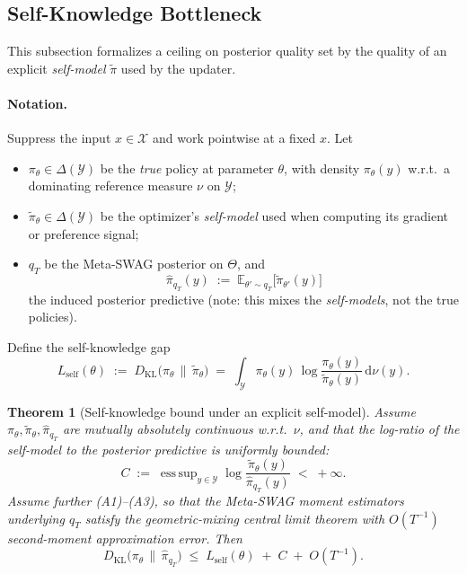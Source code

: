 \documentclass[10pt]{article}
\theoremstyle{plain}
\newtheorem{theorem}{Theorem}
\theoremstyle{definition}
\theoremstyle{remark}
\newcommand{\E}{\mathbb{E}}
\newcommand{\KL}{D_{\mathrm{KL}}}
\DeclareMathOperator*{\esssup}{ess\,sup}
\begin{document}
\subsection{Self-Knowledge Bottleneck}\label{sec:self}

This subsection formalizes a ceiling on posterior quality set by the quality of an explicit \emph{self-model} $\tilde\pi$ used by the updater.

\paragraph{Notation.} Suppress the input $x\in\mathcal{X}$ and work pointwise at a fixed $x$. Let
\begin{itemize}[leftmargin=1.5em,itemsep=0.1em]
  \item $\pi_\theta\in\Delta(\mathcal{Y})$ be the \emph{true} policy at parameter $\theta$, with density $\pi_\theta(y)$ w.r.t.\ a dominating reference measure $\nu$ on $\mathcal{Y}$;
  \item $\tilde\pi_\theta\in\Delta(\mathcal{Y})$ be the optimizer's \emph{self-model} used when computing its gradient or preference signal;
  \item $q_T$ be the Meta-SWAG posterior on $\Theta$, and
  \[
  \hat\pi_{q_T}(y) \;:=\; \E_{\theta'\sim q_T}\bigl[\tilde\pi_{\theta'}(y)\bigr]
  \]
  the induced posterior predictive (note: this mixes the \emph{self-models}, not the true policies).
\end{itemize}
Define the self-knowledge gap
\[
L_{\mathrm{self}}(\theta) \;:=\; \KL\!\bigl(\pi_\theta \,\big\|\, \tilde\pi_\theta\bigr)
\;=\; \int_\mathcal{Y} \pi_\theta(y)\,\log\!\frac{\pi_\theta(y)}{\tilde\pi_\theta(y)}\,\mathrm{d}\nu(y).
\]

\begin{theorem}[Self-knowledge bound under an explicit self-model]\label{thm:self}
Assume $\pi_\theta, \tilde\pi_\theta, \hat\pi_{q_T}$ are mutually absolutely continuous w.r.t.\ $\nu$, and that the log-ratio of the self-model to the posterior predictive is uniformly bounded:
\begin{equation}\label{eq:C}
C \;:=\; \esssup_{y\in\mathcal{Y}} \log \frac{\tilde\pi_\theta(y)}{\hat\pi_{q_T}(y)} \;<\; +\infty.
\end{equation}
Assume further (A1)--(A3), so that the Meta-SWAG moment estimators underlying $q_T$ satisfy the geometric-mixing central limit theorem with $O(T^{-1})$ second-moment approximation error. Then
\begin{equation}\label{eq:self}
\KL\!\bigl(\pi_\theta \,\big\|\, \hat\pi_{q_T}\bigr) \;\le\; L_{\mathrm{self}}(\theta) \;+\; C \;+\; O(T^{-1}).
\end{equation}
\end{theorem}
\end{document}
